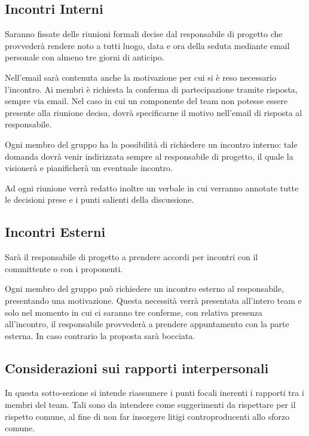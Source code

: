 \subsection{Incontri Interni}
Saranno fissate delle riunioni formali decise dal responsabile di progetto che provvederà rendere noto a tutti luogo, data e ora della seduta mediante email personale con almeno tre giorni di anticipo.

Nell'email sarà contenuta anche la motivazione per cui si è reso necessario l'incontro. Ai membri è richiesta la conferma di partecipazione tramite risposta, sempre via email. Nel caso in cui un componente del team non potesse essere presente alla riunione decisa, dovrà specificarne il motivo nell'email di risposta al responsabile.

Ogni membro del gruppo ha la possibilità di richiedere un incontro interno: tale domanda dovrà venir indirizzata sempre al responsabile di progetto, il quale la visionerà e pianificherà un eventuale incontro.

Ad ogni riunione verrà redatto inoltre un verbale in cui verranno annotate tutte le decisioni prese e i punti salienti della discussione.

\subsection{Incontri Esterni}
Sarà il responsabile di progetto a prendere accordi per incontri con il committente o con i proponenti.

Ogni membro del gruppo può richiedere un incontro esterno al responsabile, presentando una motivazione. Questa necessità verrà presentata all'intero team e solo nel momento in cui ci saranno tre conferme, con relativa presenza all'incontro, il responsabile provvederà a prendere appuntamento con la parte esterna. In caso contrario la proposta sarà bocciata.

\subsection{Considerazioni sui rapporti interpersonali}

In questa sotto-sezione si intende riassumere i punti focali inerenti i rapporti tra i membri del team. Tali sono da intendere come suggerimenti da rispettare per il rispetto comune, al fine di non far insorgere litigi controproducenti allo sforzo comune.

